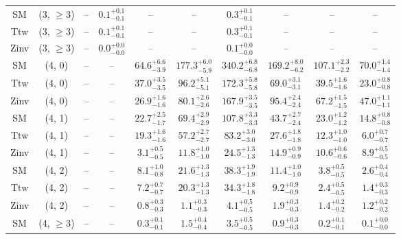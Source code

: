 \begin{table}[h!]
{\begin{tabular}{cccccccccc}
	SM & (3, $\ge3$) & -- & $0.1^{+ 0.1 }_{- 0.1 }$ & -- & -- & $0.3^{+ 0.1 }_{- 0.1 }$ & -- & -- & -- \\[0.5ex] 
	Ttw & (3, $\ge3$) & -- & $0.1^{+ 0.1 }_{- 0.1 }$ & -- & -- & $0.3^{+ 0.1 }_{- 0.1 }$ & -- & -- & -- \\[0.5ex] 
	Zinv & (3, $\ge3$) & -- & $0.0^{+ 0.0 }_{- 0.0 }$ & -- & -- & $0.1^{+ 0.0 }_{- 0.0 }$ & -- & -- & -- \\[0.5ex] 
	SM & (4, 0) & -- & -- & $64.6^{+ 6.6 }_{- 3.9 }$ & $177.3^{+ 6.0 }_{- 5.9 }$ & $340.2^{+ 6.8 }_{- 6.8 }$ & $169.2^{+ 8.0 }_{- 6.2 }$ & $107.1^{+ 2.3 }_{- 2.2 }$ & $70.0^{+ 1.4 }_{- 1.4 }$ \\[0.5ex] 
	Ttw & (4, 0) & -- & -- & $37.0^{+ 3.5 }_{- 3.5 }$ & $96.2^{+ 5.1 }_{- 5.1 }$ & $172.3^{+ 5.8 }_{- 5.8 }$ & $69.0^{+ 3.1 }_{- 3.1 }$ & $39.5^{+ 1.6 }_{- 1.6 }$ & $23.0^{+ 0.8 }_{- 0.8 }$ \\[0.5ex] 
	Zinv & (4, 0) & -- & -- & $26.9^{+ 1.6 }_{- 1.6 }$ & $80.1^{+ 2.6 }_{- 2.6 }$ & $167.9^{+ 3.5 }_{- 3.5 }$ & $95.4^{+ 2.4 }_{- 2.4 }$ & $67.2^{+ 1.5 }_{- 1.5 }$ & $47.0^{+ 1.1 }_{- 1.1 }$ \\[0.5ex] 
	SM & (4, 1) & -- & -- & $22.7^{+ 2.5 }_{- 1.7 }$ & $69.4^{+ 2.9 }_{- 2.9 }$ & $107.8^{+ 3.3 }_{- 3.3 }$ & $43.7^{+ 2.7 }_{- 2.4 }$ & $23.0^{+ 1.2 }_{- 1.2 }$ & $14.8^{+ 0.8 }_{- 0.8 }$ \\[0.5ex] 
	Ttw & (4, 1) & -- & -- & $19.3^{+ 1.6 }_{- 1.6 }$ & $57.2^{+ 2.7 }_{- 2.7 }$ & $83.2^{+ 3.0 }_{- 3.0 }$ & $27.6^{+ 1.8 }_{- 1.8 }$ & $12.3^{+ 1.0 }_{- 1.0 }$ & $6.0^{+ 0.7 }_{- 0.7 }$ \\[0.5ex] 
	Zinv & (4, 1) & -- & -- & $3.1^{+ 0.5 }_{- 0.5 }$ & $11.8^{+ 1.0 }_{- 1.0 }$ & $24.5^{+ 1.3 }_{- 1.3 }$ & $14.9^{+ 0.9 }_{- 0.9 }$ & $10.6^{+ 0.6 }_{- 0.6 }$ & $8.9^{+ 0.5 }_{- 0.5 }$ \\[0.5ex] 
	SM & (4, 2) & -- & -- & $8.1^{+ 1.0 }_{- 0.8 }$ & $21.6^{+ 1.3 }_{- 1.3 }$ & $38.3^{+ 1.9 }_{- 1.9 }$ & $11.4^{+ 1.0 }_{- 1.0 }$ & $3.8^{+ 0.5 }_{- 0.5 }$ & $2.6^{+ 0.4 }_{- 0.4 }$ \\[0.5ex] 
	Ttw & (4, 2) & -- & -- & $7.2^{+ 0.7 }_{- 0.7 }$ & $20.3^{+ 1.3 }_{- 1.3 }$ & $34.3^{+ 1.8 }_{- 1.8 }$ & $9.2^{+ 0.9 }_{- 0.9 }$ & $2.4^{+ 0.5 }_{- 0.5 }$ & $1.4^{+ 0.3 }_{- 0.3 }$ \\[0.5ex] 
	Zinv & (4, 2) & -- & -- & $0.8^{+ 0.3 }_{- 0.3 }$ & $1.1^{+ 0.3 }_{- 0.3 }$ & $4.1^{+ 0.5 }_{- 0.5 }$ & $1.9^{+ 0.3 }_{- 0.3 }$ & $1.4^{+ 0.2 }_{- 0.2 }$ & $1.2^{+ 0.2 }_{- 0.2 }$ \\[0.5ex] 
	SM & (4, $\ge3$) & -- & -- & $0.3^{+ 0.1 }_{- 0.1 }$ & $1.5^{+ 0.4 }_{- 0.4 }$ & $3.5^{+ 0.5 }_{- 0.5 }$ & $0.9^{+ 0.3 }_{- 0.3 }$ & $0.2^{+ 0.1 }_{- 0.1 }$ & $0.1^{+ 0.0 }_{- 0.0 }$ \\[0.5ex] 

\end{tabular}}
\end{table}
